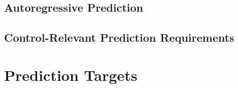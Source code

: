 %


\subsection{Autoregressive Prediction}

%
%


\subsection{Control-Relevant Prediction Requirements}

%
%
%


\section{Prediction Targets}
\label{sec:prediction_targets}

%



